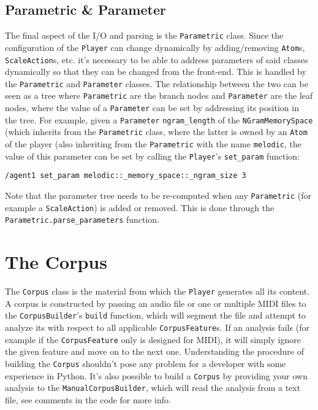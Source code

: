 
\subsection{Parametric \& Parameter}\label{ssec:2-parameters}
The final aspect of the I/O and parsing is the \texttt{Parametric} class. Since the configuration of the \texttt{Player} can change dynamically by adding/removing \texttt{Atom}s, \texttt{ScaleAction}s, etc. it's necessary to be able to address parameters of said classes dynamically so that they can be changed from the front-end. This is handled by the \texttt{Parametric} and \texttt{Parameter} classes. The relationship between the two can be seen as a tree where \texttt{Parametric} are the branch nodes and \texttt{Parameter} are the leaf nodes, where the value of a \texttt{Parameter} can be set by addressing its position in the tree. For example, given a \texttt{Parameter} \texttt{ngram\_length} of the \texttt{NGramMemorySpace} (which inherits from the \texttt{Parametric} class, where the latter is owned by an \texttt{Atom} of the player (also inheriting from the \texttt{Parametric} with the name \texttt{melodic}, the value of this parameter can be set by calling the \texttt{Player}'s \texttt{set\_param} function:
\begin{lstlisting}
/agent1 set_param melodic::_memory_space::_ngram_size 3
\end{lstlisting}
Note that the parameter tree needs to be re-computed when any \texttt{Parametric} (for example a \texttt{ScaleAction}) is added or removed. This is done through the \\ \texttt{Parametric.parse\_parameters} function.



\section{The Corpus}\label{ssec:2-corpus}
The \texttt{Corpus} class is the material from which the \texttt{Player} generates all its content. A corpus is constructed by passing an audio file or one or multiple MIDI files to the \texttt{CorpusBuilder}'s \texttt{build} function, which will segment the file and attempt to analyze its with respect to all applicable \texttt{CorpusFeature}s. If an analysis fails (for example if the \texttt{CorpusFeature} only is designed for MIDI), it will simply ignore the given feature and move on to the next one. Understanding the procedure of building the \texttt{Corpus} shouldn't pose any problem for a developer with some experience in Python. It's also possible to build a \texttt{Corpus} by providing your own analysis to the \texttt{ManualCorpusBuilder}, which will read the analysis from a text file, see comments in the code for more info.

